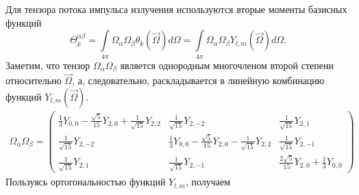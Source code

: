 Для тензора потока импульса излучения используются вторые моменты базисных функций
\[
\Theta_k^{\alpha\beta} = \int\limits_{4\pi} \Omega_{\alpha}\Omega_{\beta}\theta_k(\vec \Omega) d\Omega 
= \int\limits_{4\pi} \Omega_{\alpha}\Omega_{\beta} Y_{l,m}(\vec \Omega) d\Omega.
\]
Заметим, что тензор $\Omega_\alpha\Omega_\beta$ является однородным многочленом второй степени относительно $\vec \Omega$, а, следовательно, раскладывается в линейную комбинацию функций $Y_{l,m}(\vec \Omega)$. 
\begin{multline}
\Omega_\alpha\Omega_\beta = 
\begin{pmatrix}
\frac{1}{3}Y_{0,0} - \frac{\sqrt{5}}{15} Y_{2,0} + \frac{1}{\sqrt{15}}Y_{2,2}& \frac{1}{\sqrt{15}}Y_{2,-2} & \frac{1}{\sqrt{15}}Y_{2,1} \\
\frac{1}{\sqrt{15}}Y_{2,-2} &\frac{1}{3}Y_{0,0} - \frac{\sqrt{5}}{15} Y_{2,0} - \frac{1}{\sqrt{15}}Y_{2,2} & \frac{1}{\sqrt{15}}Y_{2,-1}\\
\frac{1}{\sqrt{15}}Y_{2,1} & \frac{1}{\sqrt{15}}Y_{2,-1} & \frac{2\sqrt{5}}{15}Y_{2,0} + \frac{1}{3}Y_{0,0}
\end{pmatrix}
\label{eq:oaob}
\end{multline}
Пользуясь ортогональностью функций $Y_{l,m}$, получаем
